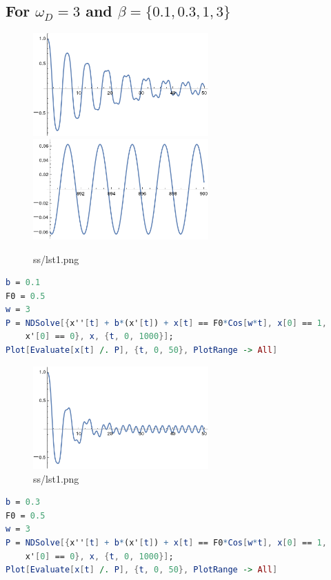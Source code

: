 \documentclass[12pt,letter]{article}
\begin{document}
{\subsection{For $\omega_D = 3$ and $\beta = \{0.1,0.3,1,3\}$ }
\begin{tcolorbox}
	\begin{figure}[H]
		\centering
		\includegraphics[width=0.6\textwidth]{ss/sshw4/1.png}
		\includegraphics[width=0.6\textwidth]{ss/sshw4/11.png}
		\caption{ss/lst1.png}
		\label{fig:ss-lst1-png}
	\end{figure}
\begin{lstlisting}[language=Mathematica]
b = 0.1
F0 = 0.5
w = 3
P = NDSolve[{x''[t] + b*(x'[t]) + x[t] == F0*Cos[w*t], x[0] == 1, 
    x'[0] == 0}, x, {t, 0, 1000}];
Plot[Evaluate[x[t] /. P], {t, 0, 50}, PlotRange -> All]
\end{lstlisting}
\end{tcolorbox}

\begin{tcolorbox}
	\begin{figure}[H]
		\centering
		\includegraphics[width=0.6\textwidth]{ss/sshw4/2.png}
		\caption{ss/lst1.png}
		\label{fig:ss-lst1-png}
	\end{figure}
\begin{lstlisting}[language=Mathematica]
b = 0.3
F0 = 0.5
w = 3
P = NDSolve[{x''[t] + b*(x'[t]) + x[t] == F0*Cos[w*t], x[0] == 1, 
    x'[0] == 0}, x, {t, 0, 1000}];
Plot[Evaluate[x[t] /. P], {t, 0, 50}, PlotRange -> All]
\end{lstlisting}
\end{tcolorbox}

}
\end{document}
